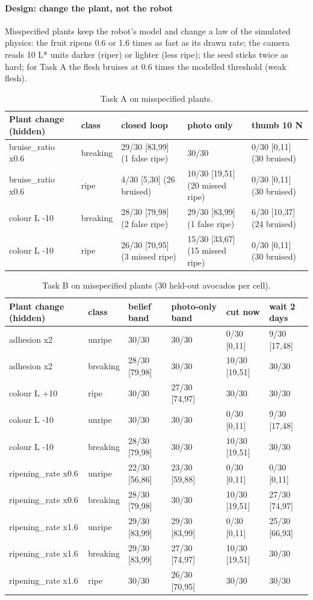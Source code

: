 \documentclass[10.5pt,a4paper]{article}
\begin{document}
\paragraph{Design: change the plant, not the robot} Misspecified plants keep the robot's model and change a law of
the simulated physics: the fruit ripens 0.6 or 1.6 times as fast as its drawn rate; the camera reads 10 L* units darker
(riper) or lighter (less ripe); the seed sticks twice as hard; for Task A the flesh bruises at 0.6 times the modelled
threshold (weak flesh).
\begin{table}[htbp]\centering\scriptsize\caption{Task A on misspecified plants.}
\begin{tabularx}{\linewidth}{@{}lllll@{}}\toprule Plant change (hidden) & class & closed loop & photo only & thumb 10 N \\\midrule
bruise\_ratio x0.6 & breaking & 29/30 [83,99] (1 false ripe) & 30/30 & 0/30 [0,11] (30 bruised) \\
bruise\_ratio x0.6 & ripe & 4/30 [5,30] (26 bruised) & 10/30 [19,51] (20 missed ripe) & 0/30 [0,11] (30 bruised) \\
colour L -10 & breaking & 28/30 [79,98] (2 false ripe) & 29/30 [83,99] (1 false ripe) & 6/30 [10,37] (24 bruised) \\
colour L -10 & ripe & 26/30 [70,95] (3 missed ripe) & 15/30 [33,67] (15 missed ripe) & 0/30 [0,11] (30 bruised) \\\bottomrule\end{tabularx}\end{table}
\begin{table}[htbp]\centering\scriptsize\caption{Task B on misspecified plants (30 held-out avocados per cell).}
\begin{tabularx}{\linewidth}{@{}llllll@{}}\toprule Plant change (hidden) & class & belief band & photo-only band & cut now & wait 2 days \\\midrule
adhesion x2 & unripe & 30/30 & 30/30 & 0/30 [0,11] & 9/30 [17,48] \\
adhesion x2 & breaking & 28/30 [79,98] & 30/30 & 10/30 [19,51] & 30/30 \\
colour L +10 & ripe & 30/30 & 27/30 [74,97] & 30/30 & 30/30 \\
colour L -10 & unripe & 30/30 & 30/30 & 0/30 [0,11] & 9/30 [17,48] \\
colour L -10 & breaking & 28/30 [79,98] & 30/30 & 10/30 [19,51] & 30/30 \\
ripening\_rate x0.6 & unripe & 22/30 [56,86] & 23/30 [59,88] & 0/30 [0,11] & 0/30 [0,11] \\
ripening\_rate x0.6 & breaking & 28/30 [79,98] & 30/30 & 10/30 [19,51] & 27/30 [74,97] \\
ripening\_rate x1.6 & unripe & 29/30 [83,99] & 29/30 [83,99] & 0/30 [0,11] & 25/30 [66,93] \\
ripening\_rate x1.6 & breaking & 29/30 [83,99] & 27/30 [74,97] & 10/30 [19,51] & 30/30 \\
ripening\_rate x1.6 & ripe & 30/30 & 26/30 [70,95] & 30/30 & 30/30 \\\bottomrule\end{tabularx}\end{table}
\end{document}
